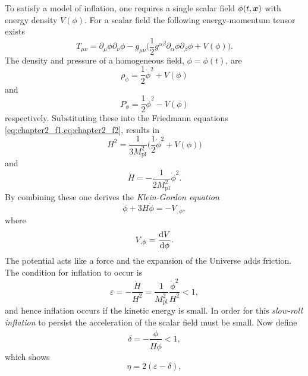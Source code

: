 \noindent
To satisfy a model of inflation, one requires a single scalar field \(\phi(t,\vb*{x})\) with energy density \(V(\phi)\).
For a scalar field the following energy-momentum tensor exists
%
\begin{equation}
	T_{\mu\nu}
	= \partial_{\mu}\phi \partial_{\nu}\phi
	- g_{\mu\nu}\bigg( \frac{1}{2}g^{\alpha\beta} \partial_{\alpha}\phi \partial_{\beta}\phi + V(\phi) \bigg).
\end{equation}
%
The density and pressure of a homogeneous field, \ie{} \(\phi = \phi(t)\), are
%
\begin{equation}
	\rho_{\phi}
	= \frac{1}{2}\dot{\phi}^{2} + V(\phi)
\end{equation}
%
and
%
\begin{equation}
	P_{\phi}
	= \frac{1}{2}\dot{\phi}^{2} - V(\phi)
\end{equation}
%
respectively.
Substituting these into the Friedmann equations \cref{eq:chapter2_f1,eq:chapter2_f2}, results in
%
\begin{equation}
	H^{2}
	= \frac{1}{3M_{\text{pl}}^{2}} \bigg(\frac{1}{2}\dot{\phi}^{2} + V(\phi)\bigg)
\end{equation}
%
and
%
\begin{equation}
	\dot{H}
	= -\frac{1}{2M_{\text{pl}}^{2}} \dot{\phi}^{2}.
\end{equation}
%
By combining these one derives the \emph{Klein-Gordon equation}
%
\begin{equation}\label{eq:chapter2_kg}
	\ddot{\phi} + 3H\dot{\phi}
	= -V_{,\phi},
\end{equation}
%
where
%
\begin{equation}
	V_{,\phi}
	= \dv{V}{\phi}.
\end{equation}
%
The potential acts like a force and the expansion of the Universe adds friction.
The condition for inflation to occur is
%
\begin{equation}
	\varepsilon
	= -\frac{\dot{H}}{H^{2}}
	= \frac{1}{M_{\text{pl}}^{2}} \frac{\dot{\phi}^{2}}{H^{2}}
	< 1,
\end{equation}
%
and hence inflation occurs if the kinetic energy is small.
In order for this \emph{slow-roll inflation} to persist the acceleration of the scalar field must be small.
Now define
%
\begin{equation}
	\delta
	= -\frac{\ddot{\phi}}{H\dot{\phi}}
	< 1,
\end{equation}
%
which shows
%
\begin{equation}
	\eta
	= 2(\varepsilon - \delta),
\end{equation}
